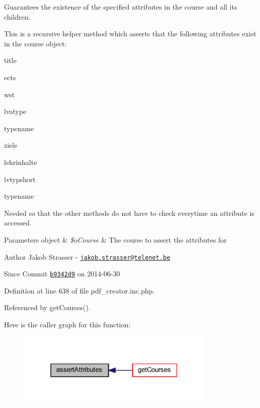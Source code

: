 Guarantees the existence of the specified attributes in the course and all its children. 

This is a recursive helper method which asserts that the following attributes exist in the course object\+:
\begin{DoxyItemize}
\item title
\item ects
\item wst
\item lvatype
\item typename
\item ziele
\item lehrinhalte
\item lvtypshort
\item typename
\end{DoxyItemize}

Needed so that the other methods do not have to check everytime an attribute is accessed.


\begin{DoxyParams}[1]{Parameters}
object & {\em \$o\+Course} & The course to assert the attributes for\\
\hline
\end{DoxyParams}
\begin{DoxyAuthor}{Author}
Jakob Strasser -\/ \href{mailto:jakob.strasser@telenet.be}{\tt jakob.\+strasser@telenet.\+be} 
\end{DoxyAuthor}
\begin{DoxySince}{Since}
Commit \href{http://github.com/TheJake123/DrupalModul/commit/b9342d941b3f93e212f3f6af0823a07524dd5954}{\tt b9342d9} on 2014-\/06-\/30 
\end{DoxySince}


Definition at line 638 of file pdf\+\_\+creator.\+inc.\+php.



Referenced by get\+Courses().



Here is the caller graph for this function\+:
\nopagebreak
\begin{figure}[H]
\begin{center}
\leavevmode
\includegraphics[width=268pt]{classoverview_p_d_f_a56f3ef341ae39bb7b4c34a700b33eac1_icgraph}
\end{center}
\end{figure}


